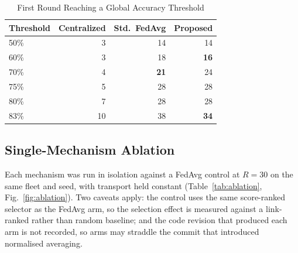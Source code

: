 \documentclass[journal]{IEEEtran}
\begin{document}
\begin{table}[!t]
\renewcommand{\arraystretch}{1.1}
\caption{First Round Reaching a Global Accuracy Threshold}
\label{tab:conv}
\centering
\footnotesize
\begin{tabular}{@{}lrrr@{}}
\toprule
Threshold & Centralized & Std.\ FedAvg & Proposed\\
\midrule
50\% & 3 & 14 & 14\\
60\% & 3 & 18 & \textbf{16}\\
70\% & 4 & \textbf{21} & 24\\
75\% & 5 & 28 & 28\\
80\% & 7 & 28 & 28\\
83\% & 10 & 38 & \textbf{34}\\
\bottomrule
\end{tabular}
\end{table}

\subsection{Single-Mechanism Ablation}\label{sec:ablation}
Each mechanism was run in isolation against a FedAvg control at $R=30$ on the same fleet and seed, with transport held constant (Table~\ref{tab:ablation}, Fig.~\ref{fig:ablation}). Two caveats apply: the control uses the same score-ranked selector as the FedAvg arm, so the selection effect is measured against a link-ranked rather than random baseline; and the code revision that produced each arm is not recorded, so arms may straddle the commit that introduced normalised averaging.
\end{document}
